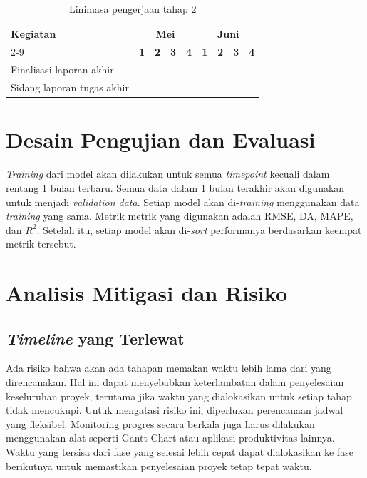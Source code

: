 \begin{table}[H]
\centering
\caption{Linimasa pengerjaan tahap 2}
\label{table:linimasa_2}
\begin{tabular}{|l|c|c|c|c|c|c|c|c|}
\hline
\rowcolor[HTML]{C0C0C0} 
\textbf{Kegiatan} & \multicolumn{4}{c|}{\textbf{Mei}} & \multicolumn{4}{c|}{\textbf{Juni}} \\
\cline{2-9} 
\rowcolor[HTML]{C0C0C0} 
 & \textbf{1} & \textbf{2} & \textbf{3} & \textbf{4} & \textbf{1} & \textbf{2} & \textbf{3} & \textbf{4} \\
\hline
Finalisasi laporan akhir & \cellcolor[HTML]{0000FF} & \cellcolor[HTML]{0000FF} & \cellcolor[HTML]{0000FF} & \cellcolor[HTML]{0000FF} & \cellcolor[HTML]{0000FF} & \cellcolor[HTML]{0000FF} & \cellcolor[HTML]{0000FF} & \cellcolor[HTML]{0000FF} \\
\hline
Sidang laporan tugas akhir & & & & & & & & \cellcolor[HTML]{0000FF} \\
\hline
\end{tabular}
\end{table}

\section{Desain Pengujian dan Evaluasi}

\textit{Training} dari model akan dilakukan untuk semua \textit{timepoint} kecuali dalam rentang 1 bulan terbaru. Semua data dalam 1 bulan terakhir akan digunakan untuk menjadi \textit{validation data}. Setiap model akan di-\textit{training} menggunakan data \textit{training} yang sama. Metrik metrik yang digunakan adalah RMSE, DA, MAPE, dan $R^2$. Setelah itu, setiap model akan di-\textit{sort} performanya berdasarkan keempat metrik tersebut.  

\section{Analisis Mitigasi dan Risiko}
\subsection{\textit{Timeline} yang Terlewat}

Ada risiko bahwa akan ada tahapan memakan waktu lebih lama dari yang direncanakan. Hal ini dapat menyebabkan keterlambatan dalam penyelesaian keseluruhan proyek, terutama jika waktu yang dialokasikan untuk setiap tahap tidak mencukupi. Untuk mengatasi risiko ini, diperlukan perencanaan jadwal yang fleksibel. Monitoring progres secara berkala juga harus dilakukan menggunakan alat seperti Gantt Chart atau aplikasi produktivitas lainnya. Waktu yang tersisa dari fase yang selesai lebih cepat dapat dialokasikan ke fase berikutnya untuk memastikan penyelesaian proyek tetap tepat waktu.

